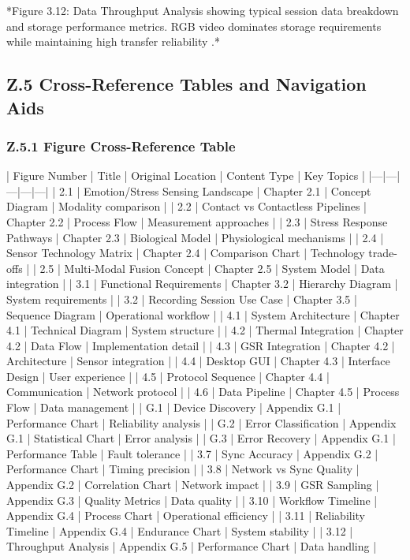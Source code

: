 *Figure 3.12: Data Throughput Analysis showing typical session data
breakdown and storage performance metrics. RGB video dominates storage
requirements while maintaining high transfer reliability \cite{ref23}.*

\subsection{Z.5 Cross-Reference Tables and Navigation Aids}

\subsubsection{Z.5.1 Figure Cross-Reference Table}

| Figure Number | Title | Original Location | Content Type | Key Topics |
|---|---|---|---|---|
| 2.1 | Emotion/Stress Sensing Landscape | Chapter 2.1 | Concept Diagram | Modality comparison |
| 2.2 | Contact vs Contactless Pipelines | Chapter 2.2 | Process Flow | Measurement approaches |
| 2.3 | Stress Response Pathways | Chapter 2.3 | Biological Model | Physiological mechanisms |
| 2.4 | Sensor Technology Matrix | Chapter 2.4 | Comparison Chart | Technology trade-offs |
| 2.5 | Multi-Modal Fusion Concept | Chapter 2.5 | System Model | Data integration |
| 3.1 | Functional Requirements | Chapter 3.2 | Hierarchy Diagram | System requirements |
| 3.2 | Recording Session Use Case | Chapter 3.5 | Sequence Diagram | Operational workflow |
| 4.1 | System Architecture | Chapter 4.1 | Technical Diagram | System structure |
| 4.2 | Thermal Integration | Chapter 4.2 | Data Flow | Implementation detail |
| 4.3 | GSR Integration | Chapter 4.2 | Architecture | Sensor integration |
| 4.4 | Desktop GUI | Chapter 4.3 | Interface Design | User experience |
| 4.5 | Protocol Sequence | Chapter 4.4 | Communication | Network protocol |
| 4.6 | Data Pipeline | Chapter 4.5 | Process Flow | Data management |
| G.1 | Device Discovery | Appendix G.1 | Performance Chart | Reliability analysis |
| G.2 | Error Classification | Appendix G.1 | Statistical Chart | Error analysis |
| G.3 | Error Recovery | Appendix G.1 | Performance Table | Fault tolerance |
| 3.7 | Sync Accuracy | Appendix G.2 | Performance Chart | Timing precision |
| 3.8 | Network vs Sync Quality | Appendix G.2 | Correlation Chart | Network impact |
| 3.9 | GSR Sampling | Appendix G.3 | Quality Metrics | Data quality |
| 3.10 | Workflow Timeline | Appendix G.4 | Process Chart | Operational efficiency |
| 3.11 | Reliability Timeline | Appendix G.4 | Endurance Chart | System stability |
| 3.12 | Throughput Analysis | Appendix G.5 | Performance Chart | Data handling |

